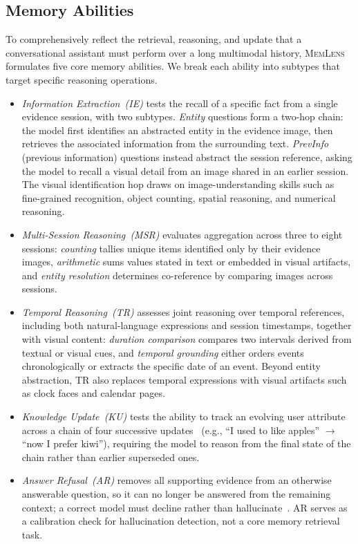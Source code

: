 \documentclass{llmxive}
\providecommand{\bench}{\textsc{MemLens}}
\begin{document}
\subsection{Memory Abilities}
\label{subsec:formulation}
To comprehensively reflect the retrieval, reasoning, and update that a conversational assistant must perform over a long multimodal history, \bench{} formulates five core memory abilities. We break each ability into subtypes that target specific reasoning operations.
\begin{itemize}
    \item \textit{Information Extraction~(IE)} tests the recall of a specific fact from a single evidence session, with two subtypes. \emph{Entity} questions form a two-hop chain: the model first identifies an abstracted entity in the evidence image, then retrieves the associated information from the surrounding text. \emph{PrevInfo} (previous information) questions instead abstract the session reference, asking the model to recall a visual detail from an image shared in an earlier session. The visual identification hop draws on image-understanding skills such as fine-grained recognition, object counting, spatial reasoning, and numerical reasoning.
    \item \textit{Multi-Session Reasoning~(MSR)} evaluates aggregation across three to eight sessions: \emph{counting} tallies unique items identified only by their evidence images, \emph{arithmetic} sums values stated in text or embedded in visual artifacts, and \emph{entity resolution} determines co-reference by comparing images across sessions.
    \item \textit{Temporal Reasoning~(TR)} assesses joint reasoning over temporal references, including both natural-language expressions and session timestamps, together with visual content: \emph{duration comparison} compares two intervals derived from textual or visual cues, and \emph{temporal grounding} either orders events chronologically or extracts the specific date of an event. Beyond entity abstraction, TR also replaces temporal expressions with visual artifacts such as clock faces and calendar pages.
    \item \textit{Knowledge Update~(KU)} tests the ability to track an evolving user attribute across a chain of four successive updates~\cite{xu2024knowledge} (e.g., ``I used to like apples'' $\to$ ``now I prefer kiwi''), requiring the model to reason from the final state of the chain rather than earlier superseded ones.
    \item \textit{Answer Refusal~(AR)} removes all supporting evidence from an otherwise answerable question, so it can no longer be answered from the remaining context; a correct model must decline rather than hallucinate~\cite{zhang2024rtuning}. AR serves as a calibration check for hallucination detection, not a core memory retrieval task.
\end{itemize}
\end{document}
